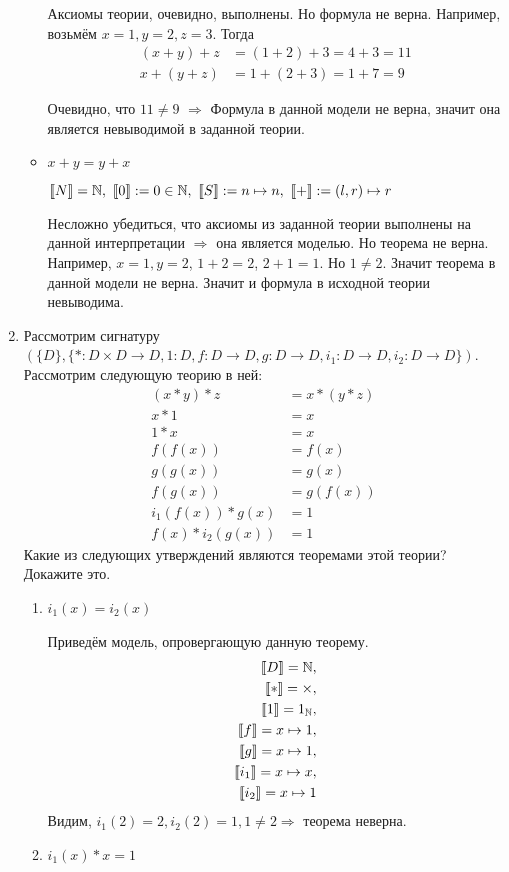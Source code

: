 \begin{enumerate}
\begin{itemize}
Аксиомы теории, очевидно, выполнены. Но формула не верна. Например, возьмём $x = 1, y = 2, z = 3$. Тогда
\begin{align*}
(x + y) + z &= (1 + 2) + 3 = 4 + 3 = 11 \\
x + (y + z) &= 1 + (2 + 3) = 1 + 7 = 9
\end{align*} 

Очевидно, что $11 \neq 9$ $\Rightarrow$ Формула в данной модели не верна, значит она является невыводимой в 
заданной теории.

\item $x + y = y + x$

$\llb N \rrb = \mathbb{N}, \
\llb 0 \rrb := 0 \in \mathbb{N},\
\llb S \rrb := n \mapsto n, \ 
\llb + \rrb := (l, r) \mapsto r$

Несложно убедиться, что аксиомы из заданной теории выполнены на данной интерпретации $\Rightarrow$ она является 
моделью. Но теорема не верна. Например, $x = 1, y = 2$, $1 + 2 = 2$, $2 + 1 = 1$. Но $1 \neq 2$. Значит теорема в 
данной модели не верна. Значит и формула в исходной теории невыводима.

\end{itemize}

\item Рассмотрим сигнатуру $(\{D\}, \{ * : D \times D \to D, 1 : D, f : D \to D, g : D \to D, i_1 : D \to D, i_2 : D \to D \})$.
    Рассмотрим следующую теорию в ней:
\begin{align*}
(x * y) * z & = x * (y * z) \\
x * 1 & = x \\
1 * x & = x \\
f(f(x)) & = f(x) \\
g(g(x)) & = g(x) \\
f(g(x)) & = g(f(x)) \\
i_1(f(x)) * g(x) & = 1 \\
f(x) * i_2(g(x)) & = 1
\end{align*}
Какие из следующих утверждений являются теоремами этой теории? Докажите это.
\begin{enumerate}
\item $i_1(x) = i_2(x)$\

Приведём модель, опровергающую данную теорему. 
\begin{align*}
\llbracket D \rrbracket = \mathbb{N}, \\
\llbracket * \rrbracket = \times, \\
\llbracket 1 \rrbracket = 1_{\mathbb{N}}, \\
\llbracket f \rrbracket = x \mapsto 1, \\
\llbracket g \rrbracket = x \mapsto 1, \\
\llbracket i_1 \rrbracket = x \mapsto x, \\
\llbracket i_2 \rrbracket = x \mapsto 1
\end{align*}
Видим, $i_1(2) = 2, i_2(2) = 1, 1 \neq 2 \Rightarrow$ теорема неверна.
\item $i_1(x) * x = 1$


\end{enumerate}
\end{enumerate}
